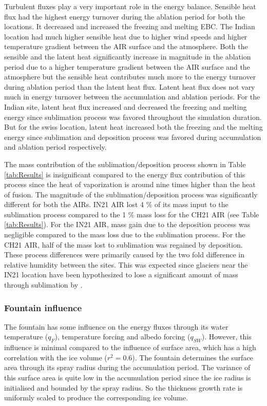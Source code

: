 \documentclass[utf8]{frontiersSCNS}
\begin{document}
Turbulent fluxes play a very important role in the energy balance. Sensible heat flux had the highest energy
turnover during the ablation period for both the locations. It decreased and increased the freezing and melting
EBC. The Indian location had much higher sensible heat due to higher wind speeds and higher temperature gradient
between the AIR surface and the atmosphere. Both the sensible and the latent heat significantly increase in
magnitude in the ablation period due to a higher temperature gradient between the AIR surface and the atmosphere
but the sensible heat contributes much more to the energy turnover during ablation period than the latent heat
flux. Latent heat flux does not vary much in energy turnover between the accumulation and ablation periods. For
the Indian site, latent heat flux increased and decreased the freezing and melting energy since sublimation
process was favored throughout the simulation duration. But for the swiss location, latent heat increased both
the freezing and the melting energy since sublimation and deposition process was favored during accumulation and
ablation period respectively.

The mass contribution of the sublimation/deposition process shown in Table \ref{tab:Results} is insignificant
compared to the energy flux contribution of this process since the heat of vaporization is around nine times
higher than the heat of fusion. The magnitude of the sublimation/deposition process was significantly different
for both the AIRs.  IN21 AIR lost 4 \% of its mass input to the sublimation process compared to the 1 \% mass
loss for the CH21 AIR (see Table \ref{tab:Results}). For the IN21 AIR, mass gain due to the deposition process
was negligible compared to the mass loss due to the sublimation process. For the CH21 AIR, half of the mass lost
to sublimation was regained by deposition. These process differences were primarily caused by the two fold
difference in relative humidity between the sites.  This was expected since glaciers near the IN21 location have
been hypothesized to lose a significant amount of mass through sublimation by \cite{azam_2018}.


\subsubsection{Fountain influence}

The fountain has some influence on the energy fluxes through its water temperature ($q_{F}$), temperature
forcing and albedo forcing ($q_{SW}$). However, this influence is minimal compared to the influence
of surface area, which has a high correlation with the ice volume ($r^2=0.6$). The fountain determines the
surface area through its spray radius during the accumulation period. The variance of this surface area is quite
low in the accumulation period since the ice radius is initialised and bounded by the spray radius. So the
thickness growth rate is uniformly scaled to produce the corresponding ice volume.
\end{document}
